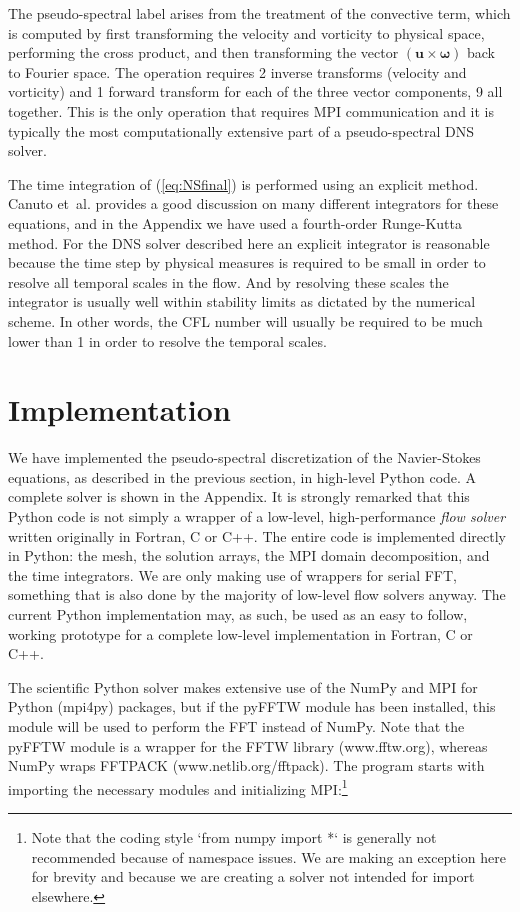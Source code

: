 \documentclass[final,3p,times,twocolumn]{elsarticle}
\begin{document}
The pseudo-spectral label arises from the treatment of the convective term, which is computed by first transforming the velocity and vorticity to physical space, performing the cross product, and then transforming the vector ${(\bm{u}  \times  \bm{\omega})}$  back to Fourier space. The operation requires 2 inverse transforms (velocity and vorticity) and 1 forward transform for each of the three vector components, 9 all together. This is the only operation that requires MPI communication and it is typically the most computationally extensive part of a pseudo-spectral DNS solver.

The time integration of (\ref{eq:NSfinal}) is performed using an explicit method. Canuto et~al. \cite{canuto1988} provides a good discussion on many different integrators for these equations, and in the Appendix we have used a fourth-order Runge-Kutta method. For the DNS solver described here an explicit integrator is reasonable because the time step by physical measures is required to be small in order to resolve all temporal scales in the flow. And by resolving these scales the integrator is usually well within stability limits as dictated by the numerical scheme. In other words, the CFL number will usually be required to be much lower than 1 in order to resolve the temporal scales.

\section{Implementation}

We have implemented the pseudo-spectral discretization of the Navier-Stokes equations, as described in the previous section, in high-level Python code. A complete solver is shown in the Appendix. It is strongly remarked that this Python code is not simply a wrapper of a low-level, high-performance \emph{flow solver} written originally in Fortran, C or C++. The entire code is implemented directly in Python: the mesh, the solution arrays, the MPI domain decomposition, and the time integrators. We are only making use of wrappers for serial FFT, something that is also done by the majority of low-level flow solvers anyway. The current Python implementation may, as such, be used as an easy to follow, working prototype for a complete low-level implementation in Fortran, C or C++.

The scientific Python solver makes extensive use of the NumPy and MPI for 
Python (mpi4py) 
packages, but if the pyFFTW  module has been installed, this module 
will be used to perform the FFT instead of NumPy. Note that the 
pyFFTW module is a wrapper for the FFTW library (www.fftw.org), 
whereas NumPy wraps FFTPACK (www.netlib.org/fftpack).  The 
program starts with importing the necessary modules and initializing 
MPI:\footnote{Note that the coding style `from numpy import *` is generally not 
recommended because of namespace issues. We are making an exception here for 
brevity and because we are creating a solver not intended for import elsewhere.}
\end{document}
